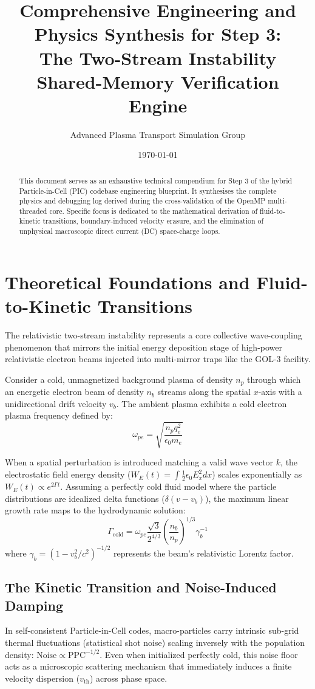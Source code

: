 \documentclass[11pt,a4paper]{article}
\title{Comprehensive Engineering and Physics Synthesis for Step 3: \\ The Two-Stream Instability Shared-Memory Verification Engine}
\author{Advanced Plasma Transport Simulation Group}
\date{\today}
\begin{document}
\maketitle

\begin{abstract}
This document serves as an exhaustive technical compendium for Step 3 of the hybrid Particle-in-Cell (PIC) codebase engineering blueprint. It synthesises the complete physics and debugging log derived during the cross-validation of the OpenMP multi-threaded core. Specific focus is dedicated to the mathematical derivation of fluid-to-kinetic transitions, boundary-induced velocity erasure, and the elimination of unphysical macroscopic direct current (DC) space-charge loops.
\end{abstract}

\section{Theoretical Foundations and Fluid-to-Kinetic Transitions}
The relativistic two-stream instability represents a core collective wave-coupling phenomenon that mirrors the initial energy deposition stage of high-power relativistic electron beams injected into multi-mirror traps like the GOL-3 facility. 

Consider a cold, unmagnetized background plasma of density $n_p$ through which an energetic electron beam of density $n_b$ streams along the spatial $x$-axis with a unidirectional drift velocity $v_b$. The ambient plasma exhibits a cold electron plasma frequency defined by:
\begin{equation}
\omega_{pe} = \sqrt{\frac{n_p q_e^2}{\epsilon_0 m_e}}
\end{equation}

When a spatial perturbation is introduced matching a valid wave vector $k$, the electrostatic field energy density ($W_E(t) = \int \frac{1}{2}\epsilon_0 E_x^2 dx$) scales exponentially as $W_E(t) \propto e^{2\Gamma t}$. Assuming a perfectly cold fluid model where the particle distributions are idealized delta functions ($\delta(v - v_b)$), the maximum linear growth rate maps to the hydrodynamic solution:
\begin{equation}
\Gamma_{\text{cold}} = \omega_{pe} \frac{\sqrt{3}}{2^{4/3}} \left(\frac{n_b}{n_p}\right)^{1/3} \gamma_b^{-1}
\end{equation}
where $\gamma_b = (1 - v_b^2/c^2)^{-1/2}$ represents the beam's relativistic Lorentz factor.

\subsection{The Kinetic Transition and Noise-Induced Damping}
In self-consistent Particle-in-Cell codes, macro-particles carry intrinsic sub-grid thermal fluctuations (statistical shot noise) scaling inversely with the population density: $\text{Noise} \propto \text{PPC}^{-1/2}$. Even when initialized perfectly cold, this noise floor acts as a microscopic scattering mechanism that immediately induces a finite velocity dispersion ($v_{\text{th}}$) across phase space. 
\end{document}
